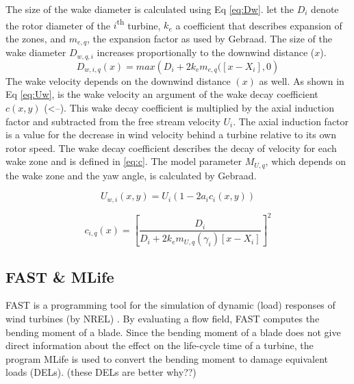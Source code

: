 The size of the wake diameter is calculated using Eq \ref{eq:Dw}. let the $D_i$ denote the rotor diameter of the $i${\textsuperscript{th}} turbine, $k_e$ a coefficient that describes expansion of the zones, and $m_{e,q}$, the expansion factor as used by Gebraad\cite{Gebraad2016}. The size of the wake diameter $D_{w,q,i}$ increases proportionally to the downwind distance ($x$). 
\begin{equation}
\label{eq:Dw}
D_{w,i,q}(x) = max({D_i + 2k_em_{e,q}([x - X_i],0} )
\end{equation}
The wake velocity depends on the downwind distance $(x)$ as well. As shown in Eq \ref{eq:Uw}, is the wake velocity an argument of the wake decay coefficient $c(x,y)$ (<--). This wake decay coefficient is multiplied by the axial induction factor and subtracted from the free stream velocity $U_i$. The axial induction factor is a value for the decrease in wind velocity behind a turbine relative to its own rotor speed. The wake decay coefficient describes the decay of velocity for each wake zone and is defined in \ref{eq:c}. The model parameter $M_{U,q}$, which depends on the wake zone and the yaw angle, is calculated by Gebraad.\cite{Gebraad2016}   

\begin{equation}
\label{eq:Uw}
U_{w,i}(x,y) = U_i\left( {1-2a_ic_i(x,y)} \right)
\end{equation} 

\begin{equation}
\label{eq:c}
c_{i,q}(x) = \left[ \frac{D_i}{D_i + 2k_em_{U,q}(\gamma_i)[x - X_i]} \right]^2
\end{equation}





\subsection{FAST \& MLife} FAST is a programming tool for the simulation of dynamic (load) responses of wind turbines (by NREL) \cite{Jonkman2005}. By evaluating a flow field, FAST computes the bending moment of a blade. Since the bending moment of a blade does not give direct information about the effect on the life-cycle time of a turbine, the program MLife is used to convert the bending moment to damage equivalent loads (DELs). (these DELs are better why??)


